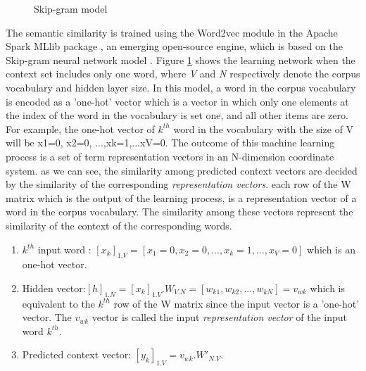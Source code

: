 \documentclass[Journal,InsideFigs, DoubleSpace]{ascelike} %
\begin{document}
{\begin{figure}[t]
	\caption{Skip-gram model}
	\label{fig:skip-gram}
\end{figure}
%
The semantic similarity is trained using the Word2vec module in the Apache Spark MLlib package \cite{apache16}, an emerging open-source engine, which is based on the Skip-gram neural network model \cite{mikolov13a}. Figure \ref{fig:skip-gram} shows the learning network when the context set includes only one word, where \textit{V} and \textit{N} respectively denote the corpus vocabulary and hidden layer size. In this model, a word in the corpus vocabulary is encoded as a 'one-hot' vector which is a vector in which only one elements at the index of the word in the vocabulary is set one, and all other items are zero. For example, the one-hot vector of $k^{th}$ word in the vocabulary with the size of V will be {x1=0, x2=0, ...,xk=1,...xV=0}. The outcome of this machine learning process is a set of term representation vectors  in an N-dimension coordinate system. as we can see, the similarity among predicted context vectors are decided by the similarity of the corresponding \textit{representation vectors}. each row of the W matrix which is the output of the learning process, is a representation vector of a word in the corpus vocabulary. The similarity among these vectors represent the similarity of the context of the corresponding words. 
%
\begin{enumerate}
	\item $k^{th}$ input word : $[x_k]_{1.V} = [x_1=0, x_2=0,...,x_k=1,..., x_V=0]$ which is an one-hot vector.
	\item Hidden vector:$[h]_{1.N} = [x_k]_{1.V}.W_{V.N} = [w_{k1},w_{k2},..., w_{kN}]= v_{wk}$ which is equivalent to the $k^{th}$ row of the W matrix since the input vector is a 'one-hot' vector. The $v_{wk}$ vector is called the input \textit{representation vector} of the input word $k^{th}$.
	\item Predicted context vector: $[y_k]_{1.V} = v_{wk}.W'_{N.V}$. 
\end{enumerate}
%
\par
}
\end{document}
